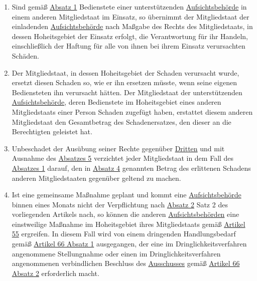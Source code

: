 \begin{enumerate}
  \item Sind gemäß \hyperref[itm:62-1]{Absatz 1} Bedienstete einer unterstützenden \hyperref[itm:04-21]
   {Aufsichtsbehörde} in einem anderen Mitgliedstaat im Einsatz, so übernimmt der Mitgliedstaat der
   einladenden \hyperref[itm:04-21]{Aufsichtsbehörde} nach Maßgabe des Rechts des Mitgliedstaats, in dessen
   Hoheitsgebiet der Einsatz erfolgt, die Verantwortung für ihr Handeln, einschließlich der Haftung für alle von ihnen
   bei ihrem Einsatz verursachten Schäden.%
  \label{itm:62-4}

  \item Der Mitgliedstaat, in dessen Hoheitsgebiet der Schaden verursacht wurde, ersetzt diesen Schaden so, wie er ihn
   ersetzen müsste, wenn seine eigenen Bediensteten ihn verursacht hätten. Der Mitgliedstaat der unterstützenden
   \hyperref[itm:04-21]{Aufsichtsbehörde}, deren Bedienstete im Hoheitsgebiet eines anderen Mitgliedstaats einer Person
    Schaden zugefügt haben, erstattet diesem anderen Mitgliedstaat den Gesamtbetrag des Schadenersatzes, den dieser an
    die Berechtigten geleistet hat.%
  \label{itm:62-5}

  \item Unbeschadet der Ausübung seiner Rechte gegenüber \hyperref[itm:04-10]{Dritten} und mit Ausnahme des \hyperref
   [itm:62-5]{Absatzes 5} verzichtet jeder Mitgliedstaat in dem Fall des \hyperref[itm:62-1]{Absatzes 1} darauf, den
   in \hyperref[itm:62-4]{Absatz 4} genannten Betrag des erlittenen Schadens anderen Mitgliedstaaten gegenüber geltend
   zu machen.%
  \label{itm:62-6}

  \item Ist eine gemeinsame Maßnahme geplant und kommt eine \hyperref[itm:04-21]{Aufsichtsbehörde} binnen eines Monats
   nicht der Verpflichtung nach \hyperref[itm:62-2]{Absatz 2} Satz 2 des vorliegenden Artikels nach, so können die
   anderen \hyperref[itm:04-21]{Aufsichtsbehörden} eine einstweilige Maßnahme im Hoheitsgebiet ihres Mitgliedstaats
   gemäß \hyperref[ch:55]{Artikel 55} ergreifen. In diesem Fall wird von einem dringenden Handlungsbedarf
   gemäß \hyperref[itm:66-1]{Artikel 66 Absatz 1} ausgegangen, der eine im Dringlichkeitsverfahren angenommene
   Stellungnahme oder einen im Dringlichkeitsverfahren angenommenen verbindlichen Beschluss des \hyperref[ch:68]{Ausschusses}
   gemäß \hyperref[itm:66-2]{Artikel 66 Absatz 2} erforderlich macht.%
  \label{itm:62-7}

\end{enumerate}   


